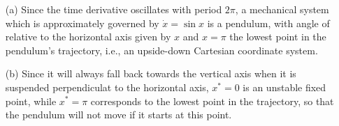 
\begin{itemize}
    \item[(a)] Since the time derivative oscillates with period $2\pi$,
        a mechanical system which is approximately governed by 
        $\dot{x} = \sin{x}$ is a pendulum, with angle of relative to the
        horizontal axis given by $x$ and $x = \pi$ the lowest point in 
        the pendulum's trajectory, i.e., an upside-down Cartesian 
        coordinate system.
    \item[(b)] Since it will always fall back 
        towards the vertical axis when it is suspended perpendiculat to
        the horizontal axis, $x^* = 0$ is an unstable fixed point, while
        $x^* = \pi$ corresponds to the lowest point in the trajectory,
        so that the pendulum will not move if it starts at this point.
\end{itemize}

